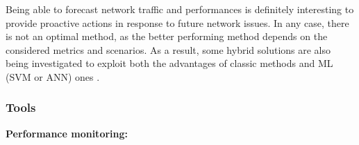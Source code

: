 
Being able to forecast network traffic and performances is definitely interesting to provide proactive actions in response to future network issues. In any case, there is not an optimal method, as the better performing method depends on the considered metrics and scenarios. As a result, some hybrid solutions are also being investigated to exploit both the advantages of classic methods and ML (SVM or ANN) ones \cite{Madan2018, Babu2015}.

\subsubsection{Tools}
\label{sec:IEEECOMSTvisualization}

\textbf{Performance monitoring:}

